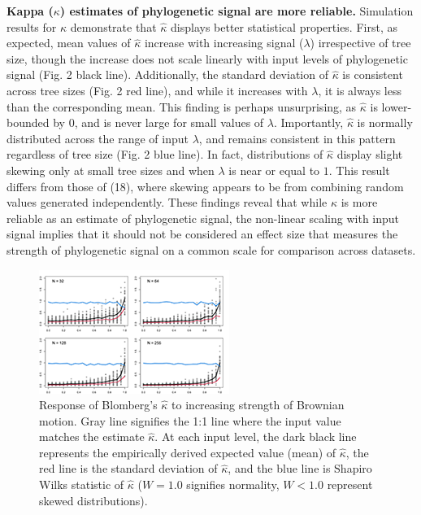 \documentclass[9pt,twocolumn,twoside,lineno]{pnas-new}
\begin{document}
\textbf{Kappa (\(\kappa\)) estimates of phylogenetic signal are more
reliable.} Simulation results for \(\hat\kappa\) demonstrate that
\(\hat\kappa\) displays better statistical properties. First, as
expected, mean values of \(\hat\kappa\) increase with increasing signal
(\(\lambda\)) irrespective of tree size, though the increase does not
scale linearly with input levels of phylogenetic signal (Fig. 2 black
line). Additionally, the standard deviation of \(\hat\kappa\) is
consistent across tree sizes (Fig. 2 red line), and while it increases
with \(\lambda\), it is always less than the corresponding mean. This
finding is perhaps unsurprising, as \(\hat\kappa\) is lower-bounded by
0, and is never large for small values of \(\lambda\). Importantly,
\(\hat\kappa\) is normally distributed across the range of input
\(\lambda\), and remains consistent in this pattern regardless of tree
size (Fig. 2 blue line). In fact, distributions of \(\hat\kappa\)
display slight skewing only at small tree sizes and when \(\lambda\) is
near or equal to \(1\). This result differs from those of (18), where
skewing appears to be from combining random values generated
independently. These findings reveal that while \(\kappa\) is more
reliable as an estimate of phylogenetic signal, the non-linear scaling
with input signal implies that it should not be considered an effect
size that measures the strength of phylogenetic signal on a common scale
for comparison across datasets.

\begin{figure}
\centering
\includegraphics{new.fig.2.temp.png}
\caption{Response of Blomberg's \(\hat\kappa\) to increasing strength of
Brownian motion. Gray line signifies the 1:1 line where the input value
matches the estimate \(\hat\kappa\). At each input level, the dark black
line represents the empirically derived expected value (mean) of
\(\hat\kappa\), the red line is the standard deviation of
\(\hat\kappa\), and the blue line is Shapiro Wilks statistic of
\(\hat\kappa\) (\(W=1.0\) signifies normality, \(W< 1.0\) represent
skewed distributions).{}}
\end{figure}
\end{document}
